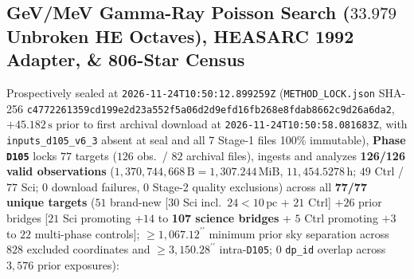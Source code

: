 \documentclass[twocolumn,10pt]{article}
\begin{document}
\subsection{GeV/MeV Gamma-Ray Poisson Search ($33.979$ Unbroken HE Octaves), HEASARC 1992 Adapter, \& 806-Star Census}
Prospectively sealed at \texttt{2026-11-24T10:50:12.899259Z} (\texttt{METHOD\_LOCK.json} SHA-256 \texttt{c4772261\allowbreak 359cd199\allowbreak e2d23a55\allowbreak 2f5a06d2\allowbreak d9efd16f\allowbreak b268e8fd\allowbreak ab8662c9\allowbreak d26a6da2}, $+45.182\,\text{s}$ prior to first archival download at \texttt{2026-11-24T10:50:58.081683Z}, with \texttt{inputs\_d105\_v6\_3} absent at seal and all 7 Stage-1 files 100\% immutable), \textbf{Phase \texttt{D105}} locks $77$ targets ($126$ obs.\ / $82$ archival files), ingests and analyzes \textbf{126/126 valid observations} ($1{,}370{,}744{,}668\,\text{B} = 1{,}307.244\,\text{MiB}$, $11{,}454.5278\,\text{h}$; $49$ Ctrl / $77$ Sci; $0$ download failures, $0$ Stage-2 quality exclusions) across all \textbf{77/77 unique targets} ($51$ brand-new [$30$ Sci incl.\ $24 < 10\,\text{pc}$ + $21$ Ctrl] $+ 26$ prior bridges [$21$ Sci promoting $+14$ to \textbf{107 science bridges} + $5$ Ctrl promoting $+3$ to $22$ multi-phase controls]; $\ge 1{,}067.12^{\prime\prime}$ minimum prior sky separation across $828$ excluded coordinates and $\ge 3{,}150.28^{\prime\prime}$ intra-\texttt{D105}; $0$ \texttt{dp\_id} overlap across $3{,}576$ prior exposures):
\end{document}
